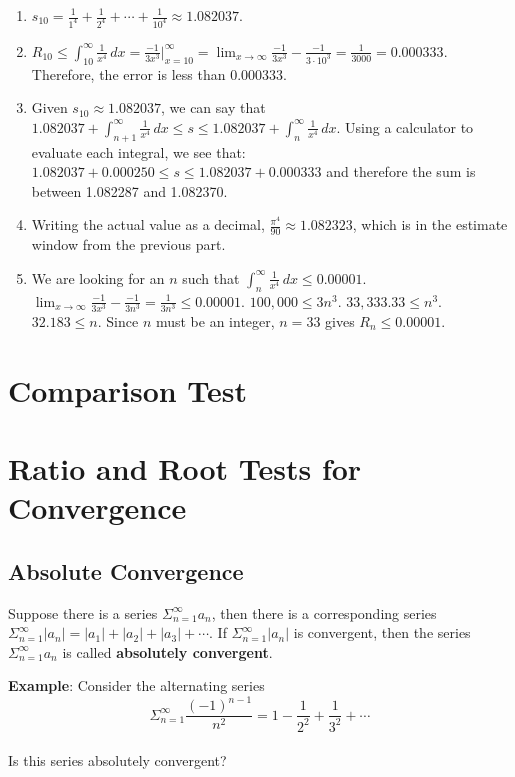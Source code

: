 \begin{Answer}[ref=remainder1]
\begin{enumerate}
\item $s_{10} = \frac{1}{1^4} + \frac{1}{2^4} + \cdots + \frac{1}{10^4} \approx 
1.082037$. 
\item $R_{10} \leq \int_{10}^\infty \frac{1}{x^4}\,dx = \frac{-1}{3x^3}|_
{x=10}^\infty = \lim_{x \to \infty} \frac{-1}{3x^3} - \frac{-1}{3 \cdot 10^3} 
= \frac{1}{3000} = 0.000333$. Therefore, the error is less than 0.000333. 
\item Given $s_{10} \approx 1.082037$, we can say that $1.082037 + \int_{n+1}^
\infty \frac{1}{x^4}\,dx \leq s \leq 1.082037 + \int_{n}^{\infty} \frac{1}{x^4}
\,dx$. Using a calculator to evaluate each integral, we see that: $1.082037 + 
0.000250 \leq s \leq 1.082037 + 0.000333$ and therefore the sum is between 
1.082287 and 1.082370. 
\item Writing the actual value as a decimal, $\frac{\pi^4}{90} \approx 
1.082323$, which is in the estimate window from the previous part. 
\item We are looking for an $n$ such that $\int_n^\infty \frac{1}{x^4}\,dx 
\leq 0.00001$. $\lim_{x \to \infty} \frac{-1}{3x^3} - \frac{-1}{3n^3} = 
\frac{1}{3n^3} \leq 0.00001$. $100,000 \leq 3n^3$. $33,333.33 \leq n^3$. 
$32.183 \leq n$. Since $n$ must be an integer, $n=33$ gives $R_n \leq 0.00001$. 
\end{enumerate}
\end{Answer}

\section{Comparison Test}

\section{Ratio and Root Tests for Convergence}
\subsection{Absolute Convergence}
Suppose there is a series $\Sigma_{n=1}^\infty a_n$, then there is a 
corresponding series $\Sigma_{n=1}^\infty |a_n| = |a_1| + |a_2| + |a_3| + 
\cdots$. If $\Sigma_{n=1}^\infty |a_n|$ is convergent, then the series $\Sigma_
{n=1}^\infty a_n$ is called \textbf{absolutely convergent}. 

\textbf{Example}: Consider the alternating series 
$$\Sigma_{n=1}^\infty \frac{(-1)^{n-1}}{n^2} = 1 - \frac{1}{2^2} + 
\frac{1}{3^2} + \cdots$$\\
Is this series absolutely convergent?

